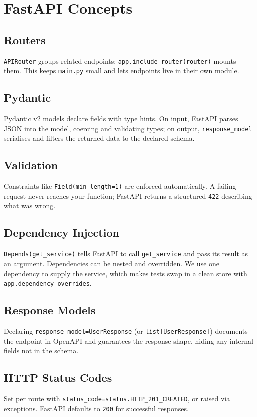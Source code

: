 \documentclass[11pt,a4paper]{report}
\begin{document}
\chapter{FastAPI Concepts}

\section{Routers}
\texttt{APIRouter} groups related endpoints; \texttt{app.include\_router(router)}
mounts them. This keeps \texttt{main.py} small and lets endpoints live in their
own module.

\section{Pydantic}
Pydantic v2 models declare fields with type hints. On input, FastAPI parses JSON
into the model, coercing and validating types; on output, \texttt{response\_model}
serialises and filters the returned data to the declared schema.

\section{Validation}
Constraints like \texttt{Field(min\_length=1)} are enforced automatically. A
failing request never reaches your function; FastAPI returns a structured
\texttt{422} describing what was wrong.

\section{Dependency Injection}
\texttt{Depends(get\_service)} tells FastAPI to call \texttt{get\_service} and
pass its result as an argument. Dependencies can be nested and overridden. We use
one dependency to supply the service, which makes tests swap in a clean store
with \texttt{app.dependency\_overrides}.

\section{Response Models}
Declaring \texttt{response\_model=UserResponse} (or \texttt{list[UserResponse]})
documents the endpoint in OpenAPI and guarantees the response shape, hiding any
internal fields not in the schema.

\section{HTTP Status Codes}
Set per route with \texttt{status\_code=status.HTTP\_201\_CREATED}, or raised via
exceptions. FastAPI defaults to \texttt{200} for successful responses.
\end{document}
